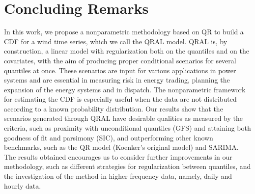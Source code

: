 \section{Concluding Remarks}

In this work, we propose a nonparametric methodology based on QR to build a CDF for a wind time series, which we call the QRAL model. QRAL is, by construction, a linear model with regularization both on the quantiles and on the covariates, with the aim of producing proper conditional scenarios for several quantiles at once. These scenarios are input for various applications in power systems and are essential in measuring risk in energy trading, planning the expansion of the energy systems and in dispatch. The nonparametric framework for estimating the CDF is especially useful when the data are not distributed according to a known probability distribution. Our results show that the scenarios generated through QRAL have desirable qualities as measured by the criteria, such as proximity with unconditional quantiles (GFS) and attaining both goodness of fit and parsimony (SIC), and outperforming other known benchmarks, such as the QR model (Koenker's original model) and SARIMA. The results obtained encourages us to consider further improvements in our methodology, such as different strategies for regularization between quantiles, and the investigation of the method in higher frequency data, namely, daily and hourly data.

